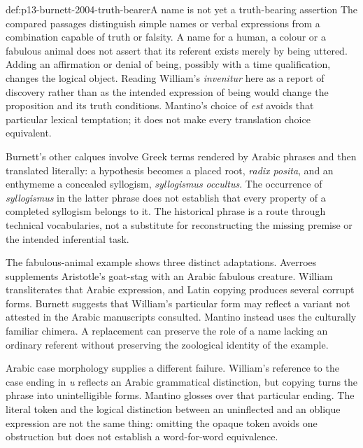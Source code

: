 \begin{hbexample}{def:p13-burnett-2004-truth-bearer}{A name is not yet a truth-bearing assertion}
The compared passages distinguish simple names or verbal
expressions from a combination capable of truth or falsity.
A name for a human, a colour or a fabulous animal does not
assert that its referent exists merely by being uttered.
Adding an affirmation or denial of being, possibly with a
time qualification, changes the logical object. Reading
William's \emph{invenitur} here as a report of discovery
rather than as the intended expression of being would
change the proposition and its truth conditions. Mantino's
choice of \emph{est} avoids that particular lexical temptation;
it does not make every translation choice equivalent.
\cite[pp.~601--602]{Burnett2004ArabicLatinHHL}
\end{hbexample}

Burnett's other calques involve Greek terms rendered by
Arabic phrases and then translated literally: a hypothesis
becomes a placed root, \emph{radix posita}, and an enthymeme
a concealed syllogism, \emph{syllogismus occultus}. The occurrence
of \emph{syllogismus} in the latter phrase does not establish
that every property of a completed syllogism belongs to it.
The historical phrase is a route through technical vocabularies,
not a substitute for reconstructing the missing premise or
the intended inferential task.
\cite[p.~602, note~16]{Burnett2004ArabicLatinHHL}

The fabulous-animal example shows three distinct adaptations.
Averroes supplements Aristotle's goat-stag with an Arabic
fabulous creature. William transliterates that Arabic expression,
and Latin copying produces several corrupt forms. Burnett
suggests that William's particular form may reflect a variant
not attested in the Arabic manuscripts consulted. Mantino
instead uses the culturally familiar chimera. A replacement
can preserve the role of a name lacking an ordinary referent
without preserving the zoological identity of the example.
\cite[p.~602]{Burnett2004ArabicLatinHHL}

Arabic case morphology supplies a different failure. William's
reference to the case ending in \emph{u} reflects an Arabic
grammatical distinction, but copying turns the phrase into
unintelligible forms. Mantino glosses over that particular
ending. The literal token and the logical distinction between
an uninflected and an oblique expression are not the same
thing: omitting the opaque token avoids one obstruction but
does not establish a word-for-word equivalence.
\cite[p.~603, note~17]{Burnett2004ArabicLatinHHL}

